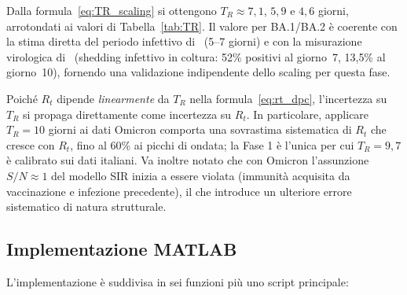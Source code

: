 \documentclass[12pt, a4paper]{article}
\begin{document}
Dalla formula~\eqref{eq:TR_scaling} si ottengono $T_R \approx 7{,}1$, $5{,}9$ e $4{,}6$ giorni,
arrotondati ai valori di Tabella~\ref{tab:TR}.
Il valore per BA.1/BA.2 è coerente con la stima diretta del periodo infettivo
di~\cite[p.~34]{UKHSA2024} (5--7 giorni) e con la misurazione virologica di~\cite{Keske2023}
(shedding infettivo in coltura: 52\% positivi al giorno~7, 13{,}5\% al giorno~10),
fornendo una validazione indipendente dello scaling per questa fase.

Poiché $R_t$ dipende \emph{linearmente} da $T_R$ nella formula~\eqref{eq:rt_dpc},
l'incertezza su $T_R$ si propaga direttamente come incertezza su $R_t$.
In particolare, applicare $T_R = 10$ giorni ai dati Omicron comporta una sovrastima sistematica
di $R_t$ che cresce con $R_t$, fino al 60\% ai picchi di ondata; la Fase 1 è l'unica per cui $T_R = 9{,}7$ è calibrato sui dati italiani.
Va inoltre notato che con Omicron l'assunzione $S/N \approx 1$ del modello SIR inizia a essere
violata (immunità acquisita da vaccinazione e infezione precedente), il che introduce un ulteriore
errore sistematico di natura strutturale.

\subsection{Implementazione MATLAB}

L'implementazione è suddivisa in sei funzioni più uno script principale:
\end{document}
